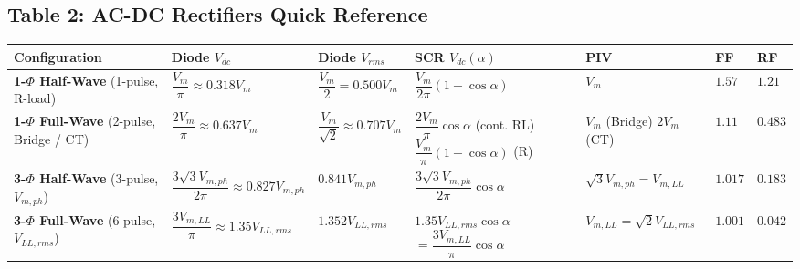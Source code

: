 \subsection{Table 2: AC-DC Rectifiers Quick Reference}
\vspace{-6pt}
\begin{center}
\vspace{-4pt}
\footnotesize
\renewcommand{\arraystretch}{1.10}
\begin{tabularx}{\textwidth}{@{} >{\raggedright\arraybackslash}p{2.6cm} >{\raggedright\arraybackslash}p{2.4cm} >{\raggedright\arraybackslash}p{2.4cm} >{\raggedright\arraybackslash}p{3.2cm} >{\raggedright\arraybackslash}p{2.4cm} >{\centering\arraybackslash}p{1.1cm} >{\centering\arraybackslash}p{1.1cm} @{}}
\toprule
\textbf{Configuration} & \textbf{Diode $V_{dc}$} & \textbf{Diode $V_{rms}$} & \textbf{SCR $V_{dc}(\alpha)$} & \textbf{PIV} & \textbf{FF} & \textbf{RF} \\
\midrule
\textbf{1-$\Phi$ Half-Wave} \newline (1-pulse, R-load) &
$\dfrac{V_m}{\pi} \approx 0.318 V_m$ &
$\dfrac{V_m}{2} = 0.500 V_m$ &
$\dfrac{V_m}{2\pi}(1 + \cos\alpha)$ &
$V_m$ &
$1.57$ &
$1.21$ \\

\textbf{1-$\Phi$ Full-Wave} \newline (2-pulse, Bridge / CT) &
$\dfrac{2V_m}{\pi} \approx 0.637 V_m$ &
$\dfrac{V_m}{\sqrt{2}} \approx 0.707 V_m$ &
$\dfrac{2V_m}{\pi}\cos\alpha$ (cont. RL) \newline
$\dfrac{V_m}{\pi}(1+\cos\alpha)$ (R) &
$V_m$ (Bridge) \newline
$2V_m$ (CT) &
$1.11$ &
$0.483$ \\

\textbf{3-$\Phi$ Half-Wave} \newline (3-pulse, $V_{m,ph}$) &
$\dfrac{3\sqrt{3}V_{m,ph}}{2\pi} \approx 0.827 V_{m,ph}$ &
$0.841 V_{m,ph}$ &
$\dfrac{3\sqrt{3}V_{m,ph}}{2\pi}\cos\alpha$ &
$\sqrt{3}V_{m,ph} = V_{m,LL}$ &
$1.017$ &
$0.183$ \\

\textbf{3-$\Phi$ Full-Wave} \newline (6-pulse, $V_{LL,rms}$) &
$\dfrac{3V_{m,LL}}{\pi} \approx 1.35 V_{LL,rms}$ &
$1.352 V_{LL,rms}$ &
$1.35 V_{LL,rms}\cos\alpha$ \newline
$= \dfrac{3V_{m,LL}}{\pi}\cos\alpha$ &
$V_{m,LL} = \sqrt{2}V_{LL,rms}$ &
$1.001$ &
$0.042$ \\
\bottomrule
\end{tabularx}
\vspace{-4pt}
\end{center}

